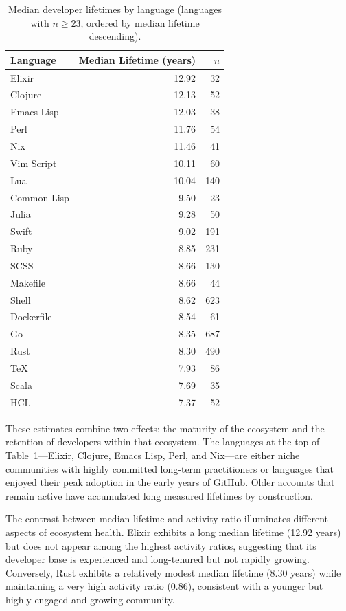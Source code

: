 \documentclass[12pt,a4paper]{article}
\begin{document}
\begin{table}[h]
\centering
\begin{tabular}{lrr}
\toprule
Language & Median Lifetime (years) & $n$ \\
\midrule
Elixir       & 12.92 &  32 \\
Clojure      & 12.13 &  52 \\
Emacs Lisp   & 12.03 &  38 \\
Perl         & 11.76 &  54 \\
Nix          & 11.46 &  41 \\
Vim Script   & 10.11 &  60 \\
Lua          & 10.04 & 140 \\
Common Lisp  &  9.50 &  23 \\
Julia        &  9.28 &  50 \\
Swift        &  9.02 & 191 \\
Ruby         &  8.85 & 231 \\
SCSS         &  8.66 & 130 \\
Makefile     &  8.66 &  44 \\
Shell        &  8.62 & 623 \\
Dockerfile   &  8.54 &  61 \\
Go           &  8.35 & 687 \\
Rust         &  8.30 & 490 \\
TeX          &  7.93 &  86 \\
Scala        &  7.69 &  35 \\
HCL          &  7.37 &  52 \\
\bottomrule
\end{tabular}
\caption{Median developer lifetimes by language (languages with $n \geq 23$,
ordered by median lifetime descending).}
\label{tab:lifetime}
\end{table}

These estimates combine two effects: the maturity of the ecosystem and the
retention of developers within that ecosystem. The languages at the top of
Table~\ref{tab:lifetime}---Elixir, Clojure, Emacs Lisp, Perl, and Nix---are
either niche communities with highly committed long-term practitioners or
languages that enjoyed their peak adoption in the early years of GitHub. Older
accounts that remain active have accumulated long measured lifetimes by
construction.

The contrast between median lifetime and activity ratio illuminates different
aspects of ecosystem health. Elixir exhibits a long median lifetime (12.92
years) but does not appear among the highest activity ratios, suggesting that
its developer base is experienced and long-tenured but not rapidly growing.
Conversely, Rust exhibits a relatively modest median lifetime (8.30 years) while
maintaining a very high activity ratio (0.86), consistent with a younger but
highly engaged and growing community.
\end{document}
